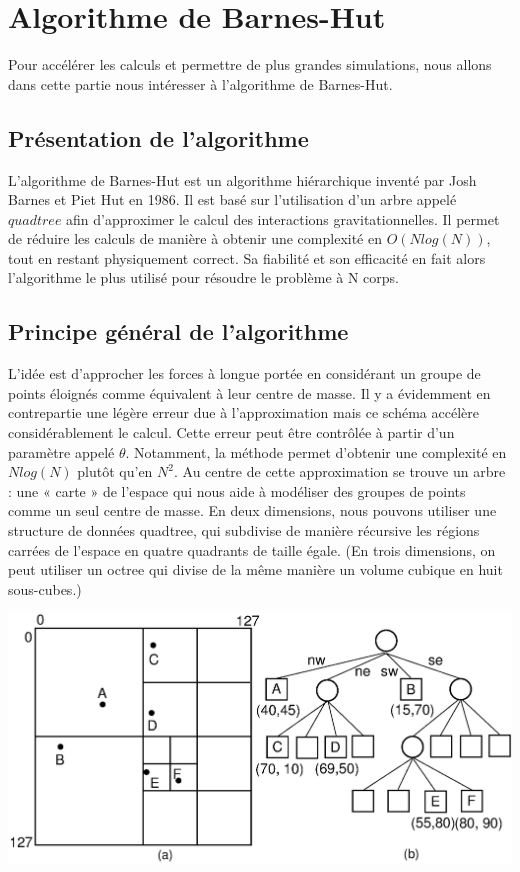 \chapter{Algorithme de Barnes-Hut}

Pour accélérer les calculs et permettre de plus grandes simulations, nous allons dans cette partie nous intéresser à l’algorithme de Barnes-Hut.

\section{Présentation de l'algorithme}

L'algorithme de Barnes-Hut est un algorithme hiérarchique inventé par Josh Barnes et Piet Hut en 1986. Il est basé sur l'utilisation d'un arbre appelé $quadtree$ afin d'approximer le calcul des  interactions gravitationnelles. Il permet de réduire les calculs de manière à obtenir une complexité en $O(Nlog(N))$, tout en restant physiquement correct. Sa fiabilité et son efficacité en fait alors l'algorithme le plus utilisé pour résoudre le problème à N corps.
 
\section{Principe général de l'algorithme}

L'idée est d'approcher les forces à longue portée en considérant un groupe de points éloignés comme équivalent à leur centre de masse. Il y a évidemment en contrepartie une légère erreur due à l'approximation mais ce schéma accélère considérablement le calcul. Cette erreur peut être contrôlée à partir d'un paramètre appelé $\theta$. Notamment, la méthode permet d'obtenir une complexité en $ Nlog(N)$ plutôt qu'en $N^2$.
Au centre de cette approximation se trouve un arbre : une « carte » de l'espace qui nous aide à modéliser des groupes de points comme un seul centre de masse. En deux dimensions, nous pouvons utiliser une structure de données quadtree, qui subdivise de manière récursive les régions carrées de l'espace en quatre quadrants de taille égale. (En trois dimensions, on peut utiliser un octree qui divise de la même manière un volume cubique en huit sous-cubes.)


\begin{center}
\includegraphics[scale=0.2]{./images/quadtree.png}
\captionsetup{hypcap=false}
\label{fig6}
\end{center}

